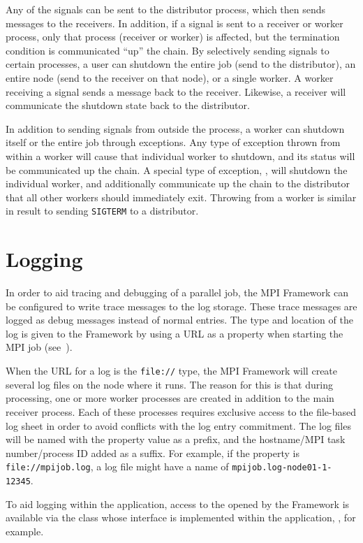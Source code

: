 Any of the signals can be sent to the distributor process, which then sends
messages to the receivers. In addition, if a signal is sent to a receiver or
worker process, only that process (receiver or worker) is affected, but the
termination condition is communicated ``up'' the chain. By selectively sending
signals to certain processes, a user can shutdown the entire job (send to the
distributor), an entire node (send to the receiver on that node), or a single
worker. A worker receiving a signal sends a message back to the receiver.
Likewise, a receiver will communicate the shutdown state back to the
distributor.

In addition to sending signals from outside the process, a worker can shutdown
itself or the entire job through exceptions. Any type of exception thrown
from within a worker will cause that individual worker to shutdown, and its
status will be communicated up the chain. A special type of exception,
, will shutdown the individual worker, and additionally
communicate up the chain to the distributor that all other workers should
immediately exit. Throwing  from a worker is similar in
result to sending \texttt{SIGTERM} to a distributor.

\section{Logging}
\label{sec-mpilogging}
In order to aid tracing and debugging of a parallel job, the MPI Framework
can be configured to write trace messages to the log storage. These trace
messages are logged as debug messages instead of normal entries.
The type and location of the log is given to the 
Framework by using a URL as a property when starting the MPI
job (see~).

When the URL for a log is the {\tt file://} type, the MPI Framework will create
several log files on the node where it runs. The reason for this is that during
 processing, one or more worker processes are created in
addition to the main receiver process. Each of these processes requires
exclusive access to the file-based log sheet in order to avoid conflicts with
the log entry commitment.
The log files will be named with the property value
as a prefix, and the hostname/MPI task number/process ID added as a suffix.
For example, if the property is \verb=file://mpijob.log=, a log file might
have a name of \verb=mpijob.log-node01-1-12345=.

To aid logging within the application, access to the  opened
by the Framework is available via the class whose interface is implemented
within the application, , for example.

